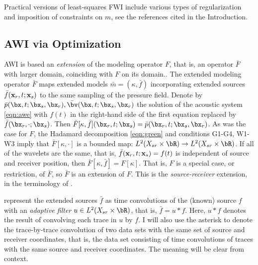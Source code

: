 Practical versions of least-squares FWI include various types of regularization and
imposition of constraints on $m$, see the references cited in the
Introduction.

\subsection{AWI via Optimization}

AWI is based an {\em extension} of the modeling operator $F$, that is,
an operator ${\bar F}$ with larger domain, coinciding with $F$ on its domain..
The extended modeling operator ${\bar F}$ maps extended models
$\bar{m}=(\kappa,\bar{f})$ incorporating extended sources
$\bar{f}({\bf x}_r,t;{\bf x}_s)$ to the same sampling of the pressure
field. Denote by $\bar{p}(\bx,t;\bx_s,\bx_r), \bar{\bv}(\bx,t;\bx_s,\bx_r)$
the solution of the acoustic system \ref{eqn:awe} with $f(t)$ in the
right-hand side of the first equation replaced by
$\bar{f}(\bx_r,\cdot;\bx_s)$. Then
$\bar{F}[\kappa,\bar{f}](\bx_r,t;\bx_s) =
\bar{p}(\bx_r,t;\bx_s,\bx_r)$. As was the case for $F$, the Hadamard
decomposition \ref{eqn:green} and conditions G1-G4, W1-W3 imply that
$\bar{F}[\kappa, \cdot]$ is a bounded map: $L^2(X_{sr} \times \bR)
\rightarrow L^2(X_{sr} \times \bR)$. If all  
of the wavelets are the same, that is, ${\bar f}({\bf  
  x}_r,t;{\bf x}_s) = f(t)$ is independent of source and receiver  
position, then ${\bar F}[\kappa,\bar{f}] = F[\kappa]$. That is, $F$ is a special
case, or restriction, of ${\bar F}$, so ${\bar F}$ is an extension of
$F$. This is the {\em source-receiver} extension, in the terminology of \cite{HuangSymes2015SEG}.

\cite{Warner:16} represent the extended sources $\bar{f}$ as time convolutions of the
(known) source $f$ with an {\em adaptive filter} $u \in L^2(X_{sr}
\times \bR)$, that is, $\bar{f}=u * f$.
Here, $u*f$ denotes the result of convolving each trace in $u$ by $f$. I
will also use the asterisk to denote the trace-by-trace convolution
of two data sets with the same set of source and receiver coordinates,
that is, the data set consisting of time convolutions of traces with the same source
and receiver coordinates. The meaning will be clear from context.

